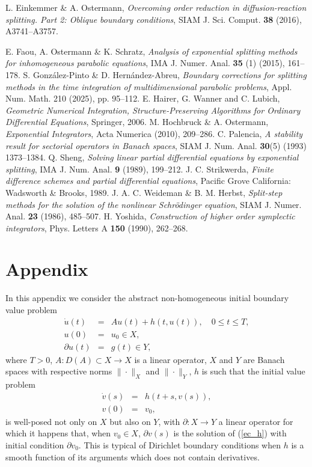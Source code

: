 \documentclass[a4paper,12pt]{article}
\begin{document}
\begin{thebibliography}{}
  L. Einkemmer \& A. Ostermann, {\it Overcoming order reduction in diffusion-reaction splitting.
Part 2: Oblique boundary conditions}, SIAM J. Sci. Comput. \textbf{38} (2016), A3741--A3757.

 E. Faou, A. Ostermann \& K. Schratz, {\it Analysis of exponential splitting methods for inhomogeneous parabolic equations}, IMA J. Numer. Anal. \textbf{35} (1) (2015),
161--178.
 S. Gonz\'alez-Pinto \& D. Hern\'andez-Abreu, {\it Boundary corrections for splitting methods in the time integration of multidimensional parabolic problems}, Appl. Num. Math. 210 (2025), pp. 95--112.
 E. Hairer, G. Wanner and C. Lubich, {\it Geometric Numerical Integration, Structure-Preserving Algorithms for Ordinary Differential Equations}, Springer, 2006.
 M. Hochbruck \& A. Ostermann, {\it Exponential Integrators},
    Acta Numerica (2010), 209--286.
 C. Palencia, {\it A stability result for sectorial operators in Banach spaces}, SIAM J. Num. Anal. \textbf{30}(5) (1993) 1373--1384.
 Q. Sheng, {\it Solving linear partial differential equations by exponential splitting}, IMA J. Num. Anal. \textbf{9} (1989), 199--212.
 J. C. Strikwerda, {\it Finite difference schemes and partial differential equations}, Pacific Grove California: Wadsworth \& Brooks, 1989.
 J. A. C. Weideman \& B. M. Herbst, {\it Split-step methods for the solution of the nonlinear Schr\"odinger equation}, SIAM J. Numer. Anal. \textbf{23} (1986), 485--507.
 H. Yoshida, {\it Construction of higher order symplectic integrators}, Phys. Letters A \textbf{150} (1990), 262--268.

\end{thebibliography}

\section{Appendix}

In this appendix we consider the abstract non-homogeneous initial boundary value problem
\begin{eqnarray}
\dot{u}(t)&=& A u(t) +h(t,u(t)), \quad 0 \le t \le T,\nonumber \\
u(0)&=&u_0\in X, \nonumber \\
\partial u(t)&=&g(t)\in Y, \label{abstract}
\end{eqnarray}
where $T>0$, $A: D(A) \subset X \to X$ is a linear operator, $X$ and $Y$ are Banach spaces with respective norms $\|\cdot\|_X$ and $\|\cdot\|_Y$, $h$ is such that
the initial value problem
\begin{eqnarray}
\dot{v}(s)&=&h(t+s, v(s)), \nonumber \\
v(0)&=&v_0, \label{ec_h}
\end{eqnarray}
is well-posed not only on $X$ but also on $Y$, with $\partial: X \to Y$ a linear operator for which it happens that, when $v_0 \in X$, $\partial v(s)$ is the solution of (\ref{ec_h}) with initial condition $\partial v_0$. This is typical of Dirichlet boundary conditions when $h$ is a smooth function of its arguments which does not contain derivatives.
\end{document}
